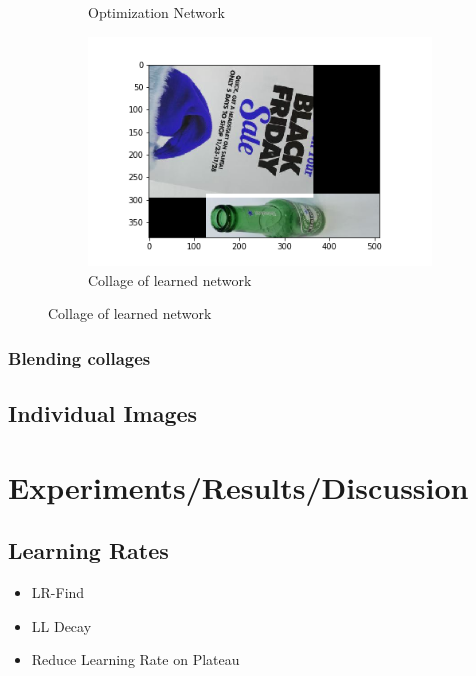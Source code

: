 \documentclass{article}
\begin{document}
\begin{figure}
\begin{subfigure}{0.2\linewidth}
     \caption{Optimization Network}
  \end{subfigure}
  \begin{subfigure}{\linewidth}
    \includegraphics[width=\linewidth]{data/images/section_4/collage_optimization_output.png}
    \caption{Collage of learned network}
  \end{subfigure}
 
    \label{fig:my_label}
\end{figure}



\subsubsection{Blending collages}

\subsection{Individual Images}

\section{Experiments/Results/Discussion}

\subsection{Learning Rates}

\begin{itemize}
    \item LR-Find
    \item LL Decay
    \item Reduce Learning Rate on Plateau
\end{itemize}
\end{document}
